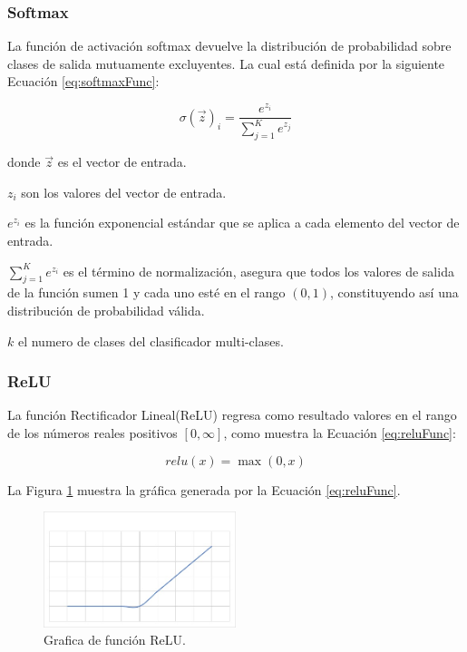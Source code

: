 \subsubsection{Softmax}

La función de activación softmax devuelve la distribución de probabilidad sobre clases de salida mutuamente excluyentes. La cual está definida por la siguiente Ecuación \ref{eq:softmaxFunc}:

\begin{equation}
\label{eq:softmaxFunc}
  \sigma(\overrightarrow{z})_{i}=\frac{e^{z_{i}}}{
    \displaystyle\sum\limits_{j=1}^K e^{z_{j}}
  }
\end{equation}

donde $\overrightarrow{z}$ es el vector de entrada.

$z_i$ son los valores del vector de entrada.

$e^{z_{i}}$ es la función exponencial estándar que se aplica a cada elemento del vector de entrada.

$\displaystyle\sum\limits_{j=1}^K e^{z_{i}}$ es el término de normalización, asegura que todos los valores de salida de la función sumen 1 y cada uno esté en el rango $(0, 1)$, constituyendo así una distribución de probabilidad válida.

$k$ el numero de clases del clasificador multi-clases.

\subsubsection{ReLU}

La función Rectificador Lineal(ReLU) regresa como resultado valores en el rango de los números reales positivos $[0, \infty]$, como muestra la Ecuación \ref{eq:reluFunc}:

\begin{equation}
\label{eq:reluFunc}
  relu(x)=\max(0,x)
\end{equation}

La Figura \ref{fig:graficaReLU} muestra la gráfica generada por la Ecuación \ref{eq:reluFunc}.

\begin{figure}[H]
    \centering
    \includegraphics[width=0.5\textwidth]{MarcoTeorico/imgs/GraficaReLU.jpg}
    \caption{Grafica de función ReLU.}
    \label{fig:graficaReLU}
\end{figure}

